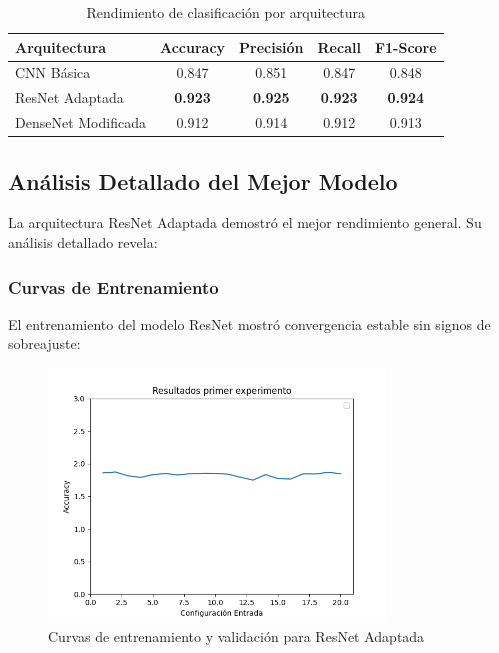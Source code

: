 \begin{table}[h!]
\centering
\caption{Rendimiento de clasificación por arquitectura}
\begin{tabular}{|l|c|c|c|c|}
\hline
\textbf{Arquitectura} & \textbf{Accuracy} & \textbf{Precisión} & \textbf{Recall} & \textbf{F1-Score} \\
\hline
CNN Básica & 0.847 & 0.851 & 0.847 & 0.848 \\
\hline
ResNet Adaptada & \textbf{0.923} & \textbf{0.925} & \textbf{0.923} & \textbf{0.924} \\
\hline
DenseNet Modificada & 0.912 & 0.914 & 0.912 & 0.913 \\
\hline
\end{tabular}
\label{tab:classification_results}
\end{table}

\subsection{Análisis Detallado del Mejor Modelo}

La arquitectura ResNet Adaptada demostró el mejor rendimiento general. Su análisis detallado revela:

\subsubsection{Curvas de Entrenamiento}

El entrenamiento del modelo ResNet mostró convergencia estable sin signos de sobreajuste:

\begin{figure}[h!]
\centering
\includegraphics[width=0.8\textwidth]{images/resultSecondEval.png}
\caption{Curvas de entrenamiento y validación para ResNet Adaptada}
\label{fig:training_curves}
\end{figure}

